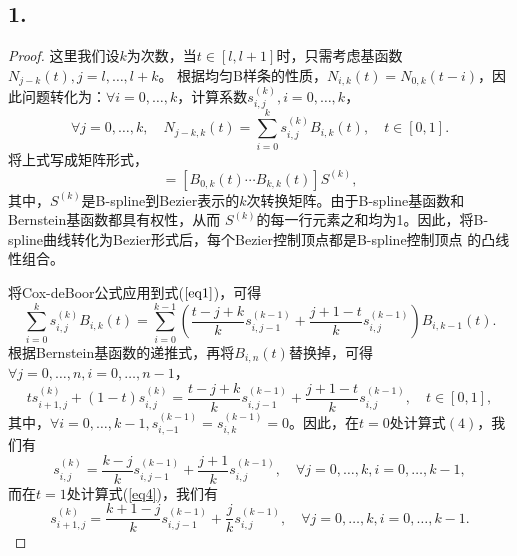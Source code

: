 \documentclass[utf8]{ctexart}
\begin{document}
\subsection*{1.}
\begin{proof}
    这里我们设$k$为次数，当$t\in [l,l+1]$时，只需考虑基函数$N_{j-k}(t), j = l,\dots,l+k$。
    根据均匀B样条的性质，$N_{i,k}(t)=N_{0,k}(t-i)$，因此问题转化为：$\forall i=0,\dots,k$，计算系数$s_{i,j}^{(k)},i=0,\dots,k$，
    \begin{equation}
        \forall j = 0,\dots,k, \quad N_{j-k,k}(t) = \sum_{i=0}^ks_{i,j}^{(k)}B_{i,k}(t),\quad t\in [0,1].
        \label{eq1}
    \end{equation}
    将上式写成矩阵形式，
    \begin{equation}
        [N_{-k,k}(t)\cdots N_{0,k}(t)] = [B_{0,k}(t)\cdots B_{k,k}(t)]S^{(k)},
        \label{eq2}
    \end{equation}
    其中，$S^{(k)}$是B-spline到Bezier表示的$k$次转换矩阵。由于B-spline基函数和Bernstein基函数都具有权性，从而
    $S^{(k)}$的每一行元素之和均为1。因此，将B-spline曲线转化为Bezier形式后，每个Bezier控制顶点都是B-spline控制顶点
    的凸线性组合。\par
    将Cox-deBoor公式应用到式($\ref{eq1}$)，可得
    \begin{equation}
        \sum_{i=0}^ks_{i,j}^{(k)}B_{i,k}(t) = \sum_{i=0}^{k-1}(\frac{t-j+k}{k}s_{i,j-1}^{(k-1)} + \frac{j+1-t}{k}s_{i,j}^{(k-1)})B_{i,k-1}(t).
        \label{eq3}
    \end{equation}
    根据Bernstein基函数的递推式，再将$B_{i,n}(t)$替换掉，可得$\forall j=0,\dots,n,i=0,\dots,n-1$，
    \begin{equation}
        ts_{i+1,j}^{(k)} + (1-t)s_{i,j}^{(k)} = \frac{t-j+k}{k}s_{i,j-1}^{(k-1)} + \frac{j+1-t}{k}s_{i,j}^{(k-1)},\quad t\in [0,1],
        \label{eq4}
    \end{equation}
    其中，$\forall i=0,\dots,k-1,s_{i,-1}^{(k-1)}=s_{i,k}^{(k-1)}=0$。因此，在$t=0$处计算式$(4)$，我们有
    \begin{equation}
        s_{i,j}^{(k)} = \frac{k-j}{k}s_{i,j-1}^{(k-1)} + \frac{j+1}{k}s_{i,j}^{(k-1)},\quad \forall j = 0,\dots,k, i = 0,\dots,k-1,
        \label{eq5}
    \end{equation}
    而在$t=1$处计算式(\ref{eq4})，我们有
    \begin{equation}
        s_{i+1,j}^{(k)} = \frac{k+1-j}{k}s_{i,j-1}^{(k-1)} + \frac{j}{k}s_{i,j}^{(k-1)},\quad \forall j = 0,\dots,k, i = 0,\dots,k-1.
        \label{eq6}
    \end{equation}

\end{proof}
\end{document}
